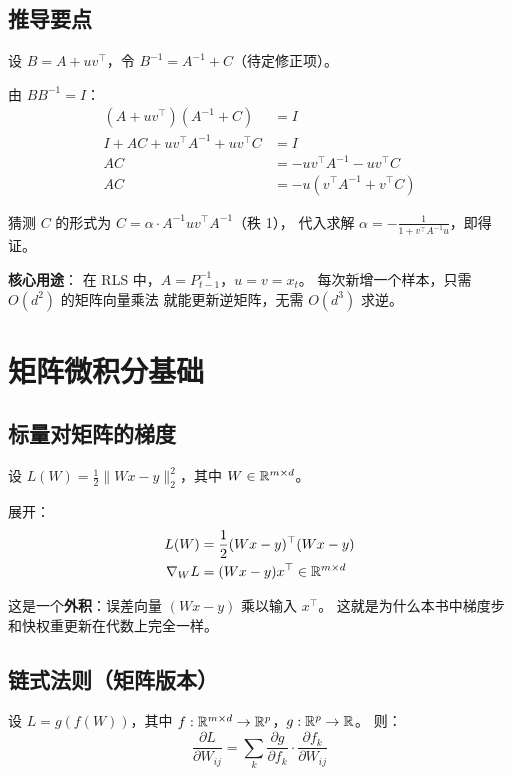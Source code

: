 \subsection*{推导要点}

设 $B = A + uv^\top$，令 $B^{-1} = A^{-1} + C$（待定修正项）。

由 $B B^{-1} = I$：
\begin{align}
  (A + uv^\top)(A^{-1} + C) &= I \\
  I + AC + uv^\top A^{-1} + uv^\top C &= I \\
  AC &= -u v^\top A^{-1} - u v^\top C \\
  AC &= -u(v^\top A^{-1} + v^\top C)
\end{align}

猜测 $C$ 的形式为 $C = \alpha \cdot A^{-1} u v^\top A^{-1}$（秩 1），
代入求解 $\alpha = -\frac{1}{1 + v^\top A^{-1} u}$，即得证。

\textbf{核心用途}：
在 RLS 中，$A = P_{t-1}^{-1}$，$u = v = x_t$。
每次新增一个样本，只需 $O(d^2)$ 的矩阵向量乘法
就能更新逆矩阵，无需 $O(d^3)$ 求逆。

\section{矩阵微积分基础}
\label{sec:app_matrix_calc}

\subsection{标量对矩阵的梯度}

设 $L(W) = \frac{1}{2}\|Wx - y\|_2^2$，其中 $W \in \mathbb{R}^{m \times d}$。

展开：
\begin{align}
  L(W) &= \frac{1}{2}(Wx - y)^\top(Wx - y) \\
  \nabla_W L &= (Wx - y) x^\top \in \mathbb{R}^{m \times d}
  \label{eq:matrix_gradient}
\end{align}

这是一个\textbf{外积}：误差向量 $(Wx - y)$ 乘以输入 $x^\top$。
这就是为什么本书中梯度步和快权重更新在代数上完全一样。

\subsection{链式法则（矩阵版本）}

设 $L = g(f(W))$，其中 $f: \mathbb{R}^{m \times d} \to \mathbb{R}^{p}$，$g: \mathbb{R}^p \to \mathbb{R}$。
则：
\[
  \frac{\partial L}{\partial W_{ij}} = \sum_k \frac{\partial g}{\partial f_k} \cdot \frac{\partial f_k}{\partial W_{ij}}
\]

